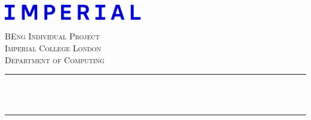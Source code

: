 \begin{titlepage}

\newcommand{\HRule}{\rule{\linewidth}{0.5mm}} %


\includegraphics[width=6cm]{title/logo.eps}\\[3cm] %
 

\center %


\textsc{\LARGE BEng Individual Project}\\[1.5cm] %
\textsc{\Large Imperial College London}\\[0.5cm] %
\textsc{\large Department of Computing}\\[0.5cm] %

\makeatletter
\rule{\textwidth}{1pt} \\[0.4cm]
{ \huge \bfseries \@title} \\[0.1cm]
\rule{\textwidth}{1pt} \\[1.5cm]
 


\end{titlepage}
